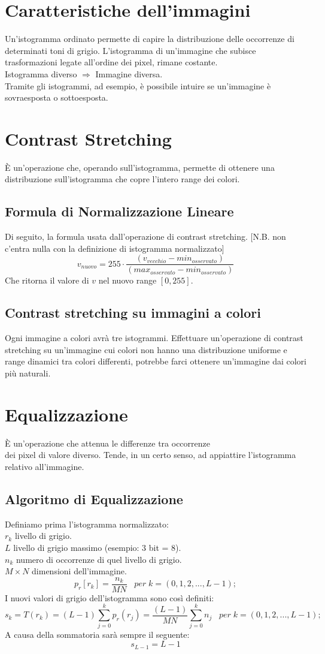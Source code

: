 \documentclass{report}
\begin{document}
	\section{Caratteristiche dell'immagini}
	Un'istogramma ordinato permette di capire la distribuzione delle occorrenze di determinati toni di grigio.
	L'istogramma di un'immagine che subisce trasformazioni legate all'ordine dei pixel, rimane costante.\\
	Istogramma diverso $\Rightarrow$ Immagine diversa.\\
	Tramite gli istogrammi, ad esempio, è possibile intuire se un'immagine è sovraesposta o sottoesposta.
	\section{Contrast Stretching}
	È un'operazione che, operando sull'istogramma, permette di ottenere una distribuzione sull'istogramma che copre l'intero range dei colori.
	\subsection{Formula di Normalizzazione Lineare}
	Di seguito, la formula usata dall'operazione di contrast stretching. [N.B. non c'entra nulla con la definizione di istogramma normalizzato]
	$$
	v_{nuovo} = 255 \cdot \frac{(v_{vecchio} - min_{osservato})}{(max_{osservato} - min_{osservato})}
	$$
	Che ritorna il valore di $v$ nel nuovo range $[0,255]$.
	\subsection{Contrast stretching su immagini a colori}
	Ogni immagine a colori avrà tre istogrammi.
	Effettuare un'operazione di contrast stretching su un'immagine cui colori non hanno una distribuzione uniforme e range dinamici tra colori differenti, potrebbe farci ottenere un'immagine dai colori più naturali.
	\section{Equalizzazione}
	È un'operazione che attenua le differenze tra occorrenze\\ dei pixel di valore diverso. Tende, in un certo senso, ad appiattire l'istogramma relativo all'immagine.
	\subsection{Algoritmo di Equalizzazione}
	Definiamo prima l'istogramma normalizzato:\\
	$r_k$ livello di grigio.\\
	$L$ livello di grigio massimo (esempio: 3 bit = 8).\\
	$n_k$ numero di occorrenze di quel livello di grigio.\\
	$M\times N$ dimensioni dell'immagine.
	$$
	p_r[r_k] = \frac{n_k}{MN} \;\;\; per \; k = (0, 1, 2,..., L-1);
	$$
	I nuovi valori di grigio dell'istogramma sono così definiti:
	$$
	s_k = T(r_k) = (L-1) \sum_{j = 0}^k p_r(r_j) =\frac{(L-1)}{MN}\sum_{j = 0}^k n_j \;\;\; per \; k = (0, 1, 2,..., L-1);
	$$
	A causa della sommatoria sarà sempre il seguente:
	$$
	s_{L-1} = L-1
	$$
	\newpage
	
\end{document}
